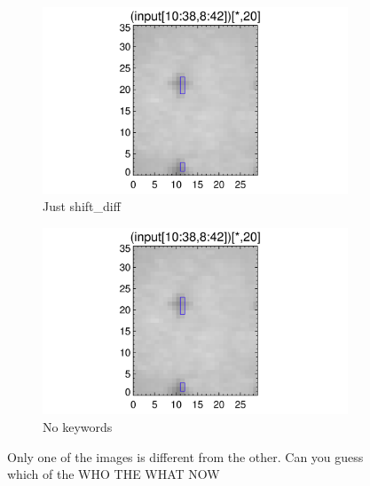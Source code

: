 \documentclass[10pt]{article}
\begin{document}
\begin{figure}[!h]
   \begin{subfigure}[b]{.45\linewidth}
        \centering
        \includegraphics[width=1.3\textwidth]{plots_tables_images/fidcheck_withshiftdifftruncate0.png}
        \caption{Just shift\_diff}
    \end{subfigure}
    \begin{subfigure}[b]{.45\linewidth}
        \centering
        \includegraphics[width=1.3\textwidth]{plots_tables_images/fidcheck_withnotruncate0.png}
        \caption{No keywords}
    \end{subfigure}
    \caption{Only one of the images is different from the other. Can you guess which of the WHO THE WHAT NOW}
    \label{whyedgetrunc}
\end{figure}
\end{document}
